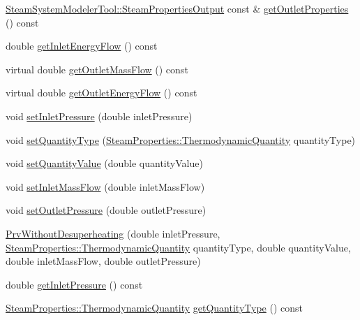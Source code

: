 \begin{DoxyCompactItemize}
\item 
\hyperlink{struct_steam_system_modeler_tool_1_1_steam_properties_output}{Steam\+System\+Modeler\+Tool\+::\+Steam\+Properties\+Output} const  \& \hyperlink{class_prv_without_desuperheating_afcf1f5d7e6b18643ac8adc9023578147}{get\+Outlet\+Properties} () const
\item 
double \hyperlink{class_prv_without_desuperheating_a040dbe6a11a722f15450cd00ac454c48}{get\+Inlet\+Energy\+Flow} () const
\item 
virtual double \hyperlink{class_prv_without_desuperheating_aefe4227f2c01209ba4ce79f6b5825d73}{get\+Outlet\+Mass\+Flow} () const
\item 
virtual double \hyperlink{class_prv_without_desuperheating_a6529a68ffa444ae87c890b2bcbc2cc84}{get\+Outlet\+Energy\+Flow} () const
\item 
void \hyperlink{class_prv_without_desuperheating_a26039a0a228ca66f96e8402bf741b9d9}{set\+Inlet\+Pressure} (double inlet\+Pressure)
\item 
void \hyperlink{class_prv_without_desuperheating_a212177b7a16c7452358df4120196c04b}{set\+Quantity\+Type} (\hyperlink{class_steam_properties_ae0294bedf7d178c2d8fb6aed0f62fbff}{Steam\+Properties\+::\+Thermodynamic\+Quantity} quantity\+Type)
\item 
void \hyperlink{class_prv_without_desuperheating_a5ed2d0f0f558705d482ed0502131757f}{set\+Quantity\+Value} (double quantity\+Value)
\item 
void \hyperlink{class_prv_without_desuperheating_abeccff2dc91144452b34ca343ee63fa7}{set\+Inlet\+Mass\+Flow} (double inlet\+Mass\+Flow)
\item 
void \hyperlink{class_prv_without_desuperheating_a0f2a4597b58390e5c4a7c75b38bbebbc}{set\+Outlet\+Pressure} (double outlet\+Pressure)
\item 
\hyperlink{class_prv_without_desuperheating_a27a40131cc8567ec51bb8d6d522268c0}{Prv\+Without\+Desuperheating} (double inlet\+Pressure, \hyperlink{class_steam_properties_ae0294bedf7d178c2d8fb6aed0f62fbff}{Steam\+Properties\+::\+Thermodynamic\+Quantity} quantity\+Type, double quantity\+Value, double inlet\+Mass\+Flow, double outlet\+Pressure)
\item 
double \hyperlink{class_prv_without_desuperheating_a4b1244b479abfaef01abbb62395dff13}{get\+Inlet\+Pressure} () const
\item 
\hyperlink{class_steam_properties_ae0294bedf7d178c2d8fb6aed0f62fbff}{Steam\+Properties\+::\+Thermodynamic\+Quantity} \hyperlink{class_prv_without_desuperheating_ad465c855f0c7271110ed2cb2ebccf081}{get\+Quantity\+Type} () const

\end{DoxyCompactItemize}

